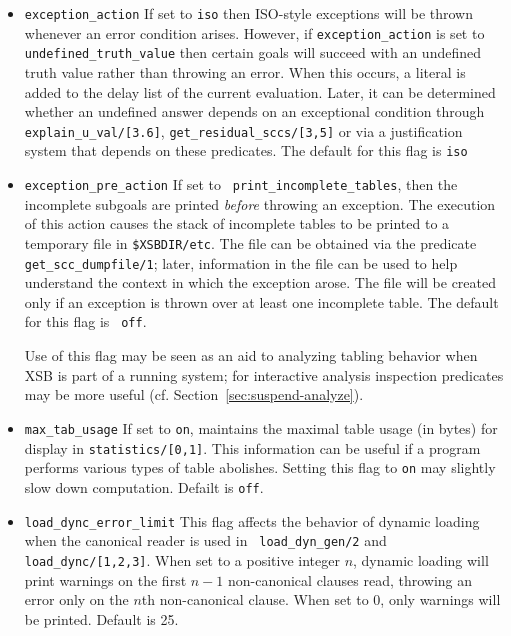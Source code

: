 \begin{description}
\begin{itemize}
\item {\tt exception\_action} If set to {\tt iso} then ISO-style
  exceptions will be thrown whenever an error condition arises.
  However, if {\tt exception\_action} is set to {\tt
    undefined\_truth\_value} then certain goals will succeed with an
  undefined truth value rather than throwing an error.  When this
  occurs, a literal is added to the delay list of the current
  evaluation.  Later, it can be determined whether an undefined answer
  depends on an exceptional condition through {\tt
    explain\_u\_val/[3.6]}, {\tt get\_residual\_sccs/[3,5]} or via a
  justification system that depends on these predicates.  The default
  for this flag is {\tt iso}
%
\item {\tt exception\_pre\_action} If set to {\tt
  print\_incomplete\_tables}, then the incomplete subgoals are printed
  {\em before} throwing an exception.  The execution of this action
  causes the stack of incomplete tables to be printed to a temporary
  file in {\tt \$XSBDIR/etc}.  The file can be obtained via the
  predicate {\tt get\_scc\_dumpfile/1}; later, information in the file
  can be used to help understand the context in which the exception
  arose.  The file will be created only if an exception is thrown over
  at least one incomplete table.  The default for this flag is {\tt
    off}.

  Use of this flag may be seen as an aid to analyzing tabling behavior
  when XSB is part of a running system; for interactive analysis
  inspection predicates may be more useful
  (cf. Section~\ref{sec:suspend-analyze}).
%
\item {\tt max\_tab\_usage} If set to {\tt on}, maintains the maximal
  table usage (in bytes) for display in {\tt statistics/[0,1]}.  This
  information can be useful if a program performs various types of
  table abolishes.  Setting this flag to {\tt on} may slightly slow
  down computation.  Defailt is {\tt off}.

\item {\tt load\_dync\_error\_limit} This flag affects the behavior of
  dynamic loading when the canonical reader is used in {\tt
    load\_dyn\_gen/2} and {\tt load\_dync/[1,2,3]}.  When set to a
  positive integer $n$, dynamic loading will print warnings on the
  first $n-1$ non-canonical clauses read, throwing an error only on
  the $n$th non-canonical clause.  When set to 0, only warnings will
  be printed.  Default is 25.
\end{itemize}


\end{description}
